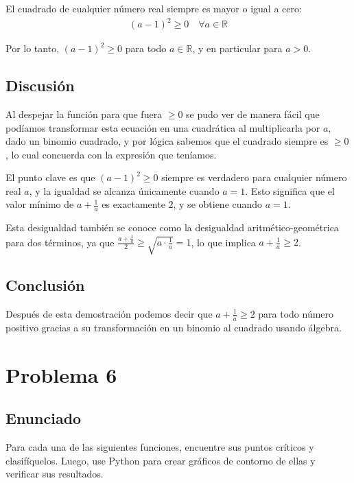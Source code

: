 \documentclass{article}
\begin{document}
El cuadrado de cualquier número real siempre es mayor o igual a cero:
\begin{align}
(a - 1)^2 \geq 0 \quad \forall a \in \mathbb{R}
\end{align}

Por lo tanto, $(a - 1)^2 \geq 0$ para todo $a \in \mathbb{R}$, y en particular para $a > 0$.


\subsection{Discusión}

Al despejar la función para que fuera $\geq 0$ se pudo ver de manera fácil que podíamos transformar esta ecuación en una cuadrática al multiplicarla por $a$, dado un binomio cuadrado, y por lógica sabemos que el cuadrado siempre es $\geq 0$, lo cual concuerda con la expresión que teníamos.

El punto clave es que $(a-1)^2 \geq 0$ siempre es verdadero para cualquier número real $a$, y la igualdad se alcanza únicamente cuando $a = 1$. Esto significa que el valor mínimo de $a + \frac{1}{a}$ es exactamente $2$, y se obtiene cuando $a = 1$.

Esta desigualdad también se conoce como la desigualdad aritmético-geométrica para dos términos, ya que $\frac{a + \frac{1}{a}}{2} \geq \sqrt{a \cdot \frac{1}{a}} = 1$, lo que implica $a + \frac{1}{a} \geq 2$.

\subsection{Conclusión}

Después de esta demostración podemos decir que $a + \frac{1}{a} \geq 2$ para todo número positivo gracias a su transformación en un binomio al cuadrado usando álgebra.

\section{Problema 6}

\subsection{Enunciado}
Para cada una de las siguientes funciones, encuentre sus puntos críticos y clasifíquelos. Luego, use Python para crear gráficos de contorno de ellas y verificar sus resultados.
\end{document}
